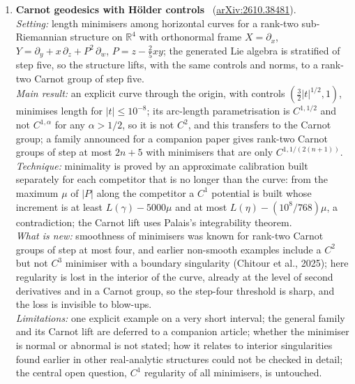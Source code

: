 \documentclass[11pt,a4paper]{article}
\newcommand{\Rset}{\mathbb{R}}
\begin{document}
\begin{enumerate}[leftmargin=*]
  \emph{Verdict:} a tight characterisation for an infinite-dimensional uncertainty class that reduces to a single linear test, obtained with a genuinely new tool; confidence high (full text).
  \item \textbf{Carnot geodesics with H{\"o}lder controls}~\cite{cavallucci2026carnot} (\href{https://arxiv.org/abs/2610.38481}{arXiv:2610.38481}).\\
  \emph{Setting:} length minimisers among horizontal curves for a rank-two sub-Riemannian structure on $\Rset^4$ with orthonormal frame $X = \partial_x$, $Y = \partial_y + x\,\partial_z + P^2\,\partial_w$, $P = z - \tfrac{2}{5}xy$; the generated Lie algebra is stratified of step five, so the structure lifts, with the same controls and norms, to a rank-two Carnot group of step five.\\
  \emph{Main result:} an explicit curve through the origin, with controls $(\tfrac{3}{2}|t|^{1/2}, 1)$, minimises length for $|t| \le 10^{-8}$; its arc-length parametrisation is $C^{1,1/2}$ and not $C^{1,\alpha}$ for any $\alpha > 1/2$, so it is not $C^2$, and this transfers to the Carnot group; a family announced for a companion paper gives rank-two Carnot groups of step at most $2n+5$ with minimisers that are only $C^{1,1/(2(n+1))}$.\\
  \emph{Technique:} minimality is proved by an approximate calibration built separately for each competitor that is no longer than the curve: from the maximum $\mu$ of $|P|$ along the competitor a $C^1$ potential is built whose increment is at least $L(\gamma) - 5000\mu$ and at most $L(\eta) - (10^8/768)\mu$, a contradiction; the Carnot lift uses Palais's integrability theorem.\\
  \emph{What is new:} smoothness of minimisers was known for rank-two Carnot groups of step at most four, and earlier non-smooth examples include a $C^2$ but not $C^3$ minimiser with a boundary singularity (Chitour et al., 2025); here regularity is lost in the interior of the curve, already at the level of second derivatives and in a Carnot group, so the step-four threshold is sharp, and the loss is invisible to blow-ups.\\
  \emph{Limitations:} one explicit example on a very short interval; the general family and its Carnot lift are deferred to a companion article; whether the minimiser is normal or abnormal is not stated; how it relates to interior singularities found earlier in other real-analytic structures could not be checked in detail; the central open question, $C^1$ regularity of all minimisers, is untouched.\\

\end{enumerate}
\end{document}
